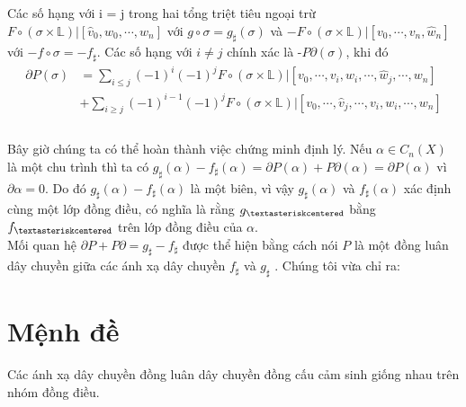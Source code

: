 \indent Các số hạng với i = j trong hai tổng triệt tiêu ngoại trừ \(F\circ(\sigma \times \mathds{L}) | [\hat{v}_0,w_0,\cdots,w_n]\) với \(g \circ \sigma = g_{\sharp}(\sigma)\) và \(-F\circ(\sigma \times \mathds{L}) | [v_0,\cdots,v_n,\hat{w}_n]\) với  \(-f\circ\sigma=-f_{\sharp}\). Các số hạng với \(i \neq j\) chính xác là -\(P\partial(\sigma)\), khi đó \\
\begin{equation*}\label{eq:pareto mle2}
	\begin{aligned}
		\partial P(\sigma) & = \sum_{i \leq j}(-1)^{i}(-1)^{j}F\circ(\sigma \times \mathds{L}) | [v_0, \cdots, v_i,w_i,\cdots,\hat{w}_j,\cdots,w_n] \\
		& + \sum_{i \geq j}(-1)^{i-1}(-1)^{j}F\circ(\sigma \times \mathds{L}) | [v_0, \cdots, \hat{v}_j,\cdots,v_i,w_i,\cdots,w_n] \\
	\end{aligned}
\end{equation*} \\
\indent Bây giờ chúng ta có thể hoàn thành việc chứng minh định lý. Nếu \(\alpha \in C_n(X)\) là một chu trình thì ta có \(g_{\sharp}(\alpha) −f_{\sharp}(\alpha) = \partial P(\alpha) + P \partial(\alpha) = \partial P (\alpha)\) vì \(\partial \alpha = 0\). Do đó \(g_{\sharp}(\alpha)−f_{\sharp}(\alpha)\) là một biên, vì vậy \(g_{\sharp}(\alpha)\) và \(f_{\sharp}(\alpha)\) xác định cùng một lớp đồng điều, có nghĩa là rằng \(g_{\textasteriskcentered}\) bằng \(f_{\textasteriskcentered}\) trên lớp đồng điều của \(\alpha\). \\
\indent Mối quan hệ \(\partial P + P \partial = g_{\sharp} −f_{\sharp}\) được thể hiện bằng cách nói \(P\) là một đồng luân dây chuyền giữa các ánh xạ dây chuyền \(f_{\sharp}\) và \( g_{\sharp}\) . Chúng tôi vừa chỉ ra:

\section{Mệnh đề}
\indent Các ánh xạ dây chuyền đồng luân dây chuyền đồng cấu cảm sinh giống nhau trên nhóm đồng điều.